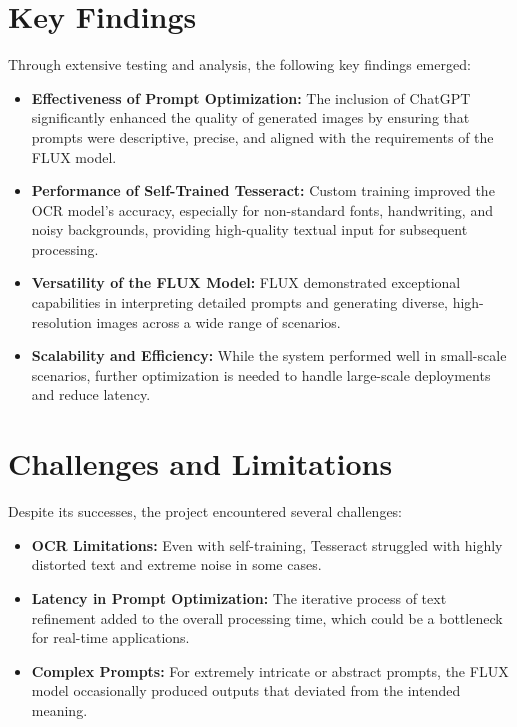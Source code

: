 \section{Key Findings}
Through extensive testing and analysis, the following key findings emerged:
\begin{itemize}
    \item \textbf{Effectiveness of Prompt Optimization:} The inclusion of ChatGPT significantly enhanced the quality of generated images by ensuring that prompts were descriptive, precise, and aligned with the requirements of the FLUX model.
    \item \textbf{Performance of Self-Trained Tesseract:} Custom training improved the OCR model's accuracy, especially for non-standard fonts, handwriting, and noisy backgrounds, providing high-quality textual input for subsequent processing.
    \item \textbf{Versatility of the FLUX Model:} FLUX demonstrated exceptional capabilities in interpreting detailed prompts and generating diverse, high-resolution images across a wide range of scenarios.
    \item \textbf{Scalability and Efficiency:} While the system performed well in small-scale scenarios, further optimization is needed to handle large-scale deployments and reduce latency.
\end{itemize}

\section{Challenges and Limitations}
Despite its successes, the project encountered several challenges:
\begin{itemize}
    \item \textbf{OCR Limitations:} Even with self-training, Tesseract struggled with highly distorted text and extreme noise in some cases.
    \item \textbf{Latency in Prompt Optimization:} The iterative process of text refinement added to the overall processing time, which could be a bottleneck for real-time applications.
    \item \textbf{Complex Prompts:} For extremely intricate or abstract prompts, the FLUX model occasionally produced outputs that deviated from the intended meaning.
\end{itemize}

